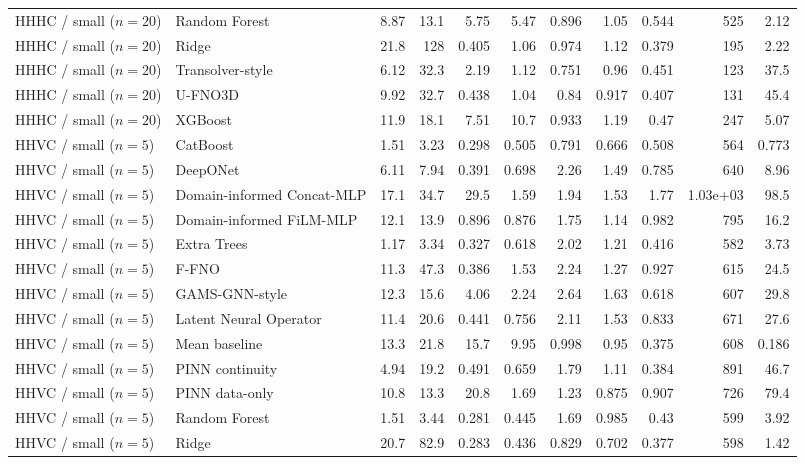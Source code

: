 \begin{landscape}
\begin{longtable}{p{2.8cm}p{3.6cm}rrrrrrrrr}
HHHC / small ($n=20$) & Random Forest & 8.87 & 13.1 & 5.75 & 5.47 & 0.896 & 1.05 & 0.544 & 525 & 2.12 \\
HHHC / small ($n=20$) & Ridge & 21.8 & 128 & 0.405 & 1.06 & 0.974 & 1.12 & 0.379 & 195 & 2.22 \\
HHHC / small ($n=20$) & Transolver-style & 6.12 & 32.3 & 2.19 & 1.12 & 0.751 & 0.96 & 0.451 & 123 & 37.5 \\
HHHC / small ($n=20$) & U-FNO3D & 9.92 & 32.7 & 0.438 & 1.04 & 0.84 & 0.917 & 0.407 & 131 & 45.4 \\
HHHC / small ($n=20$) & XGBoost & 11.9 & 18.1 & 7.51 & 10.7 & 0.933 & 1.19 & 0.47 & 247 & 5.07 \\
HHVC / small ($n=5$) & CatBoost & 1.51 & 3.23 & 0.298 & 0.505 & 0.791 & 0.666 & 0.508 & 564 & 0.773 \\
HHVC / small ($n=5$) & DeepONet & 6.11 & 7.94 & 0.391 & 0.698 & 2.26 & 1.49 & 0.785 & 640 & 8.96 \\
HHVC / small ($n=5$) & Domain-informed Concat-MLP & 17.1 & 34.7 & 29.5 & 1.59 & 1.94 & 1.53 & 1.77 & 1.03e+03 & 98.5 \\
HHVC / small ($n=5$) & Domain-informed FiLM-MLP & 12.1 & 13.9 & 0.896 & 0.876 & 1.75 & 1.14 & 0.982 & 795 & 16.2 \\
HHVC / small ($n=5$) & Extra Trees & 1.17 & 3.34 & 0.327 & 0.618 & 2.02 & 1.21 & 0.416 & 582 & 3.73 \\
HHVC / small ($n=5$) & F-FNO & 11.3 & 47.3 & 0.386 & 1.53 & 2.24 & 1.27 & 0.927 & 615 & 24.5 \\
HHVC / small ($n=5$) & GAMS-GNN-style & 12.3 & 15.6 & 4.06 & 2.24 & 2.64 & 1.63 & 0.618 & 607 & 29.8 \\
HHVC / small ($n=5$) & Latent Neural Operator & 11.4 & 20.6 & 0.441 & 0.756 & 2.11 & 1.53 & 0.833 & 671 & 27.6 \\
HHVC / small ($n=5$) & Mean baseline & 13.3 & 21.8 & 15.7 & 9.95 & 0.998 & 0.95 & 0.375 & 608 & 0.186 \\
HHVC / small ($n=5$) & PINN continuity & 4.94 & 19.2 & 0.491 & 0.659 & 1.79 & 1.11 & 0.384 & 891 & 46.7 \\
HHVC / small ($n=5$) & PINN data-only & 10.8 & 13.3 & 20.8 & 1.69 & 1.23 & 0.875 & 0.907 & 726 & 79.4 \\
HHVC / small ($n=5$) & Random Forest & 1.51 & 3.44 & 0.281 & 0.445 & 1.69 & 0.985 & 0.43 & 599 & 3.92 \\
HHVC / small ($n=5$) & Ridge & 20.7 & 82.9 & 0.283 & 0.436 & 0.829 & 0.702 & 0.377 & 598 & 1.42 \\

\end{longtable}
\end{landscape}
